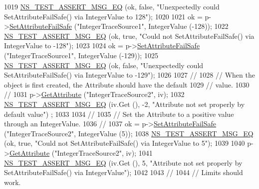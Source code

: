 \begin{DoxyCode}
1019   \hyperlink{group__testing_ga2a9d78cffb3db8e867c35fff0b698cf5}{NS\_TEST\_ASSERT\_MSG\_EQ} (ok, \textcolor{keyword}{false}, \textcolor{stringliteral}{"Unexpectedly could SetAttributeFailSafe() via
       IntegerValue to 128"});
1020 
1021   ok = p->\hyperlink{classns3_1_1ObjectBase_aa7d333004e970f925a4ed5df275541b5}{SetAttributeFailSafe} (\textcolor{stringliteral}{"IntegerTraceSource1"}, IntegerValue (-128));
1022   \hyperlink{group__testing_ga2a9d78cffb3db8e867c35fff0b698cf5}{NS\_TEST\_ASSERT\_MSG\_EQ} (ok, \textcolor{keyword}{true}, \textcolor{stringliteral}{"Could not SetAttributeFailSafe() via IntegerValue
       to -128"});
1023 
1024   ok = p->\hyperlink{classns3_1_1ObjectBase_aa7d333004e970f925a4ed5df275541b5}{SetAttributeFailSafe} (\textcolor{stringliteral}{"IntegerTraceSource1"}, IntegerValue (-129));
1025   \hyperlink{group__testing_ga2a9d78cffb3db8e867c35fff0b698cf5}{NS\_TEST\_ASSERT\_MSG\_EQ} (ok, \textcolor{keyword}{false}, \textcolor{stringliteral}{"Unexpectedly could SetAttributeFailSafe() via
       IntegerValue to -129"});
1026 
1027   \textcolor{comment}{//}
1028   \textcolor{comment}{// When the object is first created, the Attribute should have the default }
1029   \textcolor{comment}{// value.}
1030   \textcolor{comment}{//}
1031   p->\hyperlink{classns3_1_1ObjectBase_a895d1de2f96063d0e0fd78463e7a7e30}{GetAttribute} (\textcolor{stringliteral}{"IntegerTraceSource2"}, iv);
1032   \hyperlink{group__testing_ga2a9d78cffb3db8e867c35fff0b698cf5}{NS\_TEST\_ASSERT\_MSG\_EQ} (iv.Get (), -2, \textcolor{stringliteral}{"Attribute not set properly by default value"})
      ;
1033 
1034   \textcolor{comment}{//}
1035   \textcolor{comment}{// Set the Attribute to a positive value through an IntegerValue.}
1036   \textcolor{comment}{//}
1037   ok = p->\hyperlink{classns3_1_1ObjectBase_aa7d333004e970f925a4ed5df275541b5}{SetAttributeFailSafe} (\textcolor{stringliteral}{"IntegerTraceSource2"}, IntegerValue (5));
1038   \hyperlink{group__testing_ga2a9d78cffb3db8e867c35fff0b698cf5}{NS\_TEST\_ASSERT\_MSG\_EQ} (ok, \textcolor{keyword}{true}, \textcolor{stringliteral}{"Could not SetAttributeFailSafe() via IntegerValue
       to 5"});
1039 
1040   p->\hyperlink{classns3_1_1ObjectBase_a895d1de2f96063d0e0fd78463e7a7e30}{GetAttribute} (\textcolor{stringliteral}{"IntegerTraceSource2"}, iv);
1041   \hyperlink{group__testing_ga2a9d78cffb3db8e867c35fff0b698cf5}{NS\_TEST\_ASSERT\_MSG\_EQ} (iv.Get (), 5, \textcolor{stringliteral}{"Attribute not set properly by
       SetAttributeFailSafe() via IntegerValue"});
1042 
1043   \textcolor{comment}{//}
1044   \textcolor{comment}{// Limits should work.}

\end{DoxyCode}
